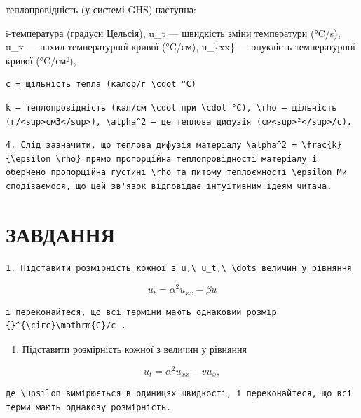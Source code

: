 \documentclass[
  ukrainian,
]{article}
\providecommand{\tightlist}{%
  \setlength{\itemsep}{0pt}\setlength{\parskip}{0pt}}
\begin{document}
теплопровідність (у системі GHS) наступна:

i-температура (градуси Цельсія), u\_t --- швидкість зміни температури
(°C/s), u\_x --- нахил температурної кривої (°C/см), u\_\{xx\} ---
опуклість температурної кривої (°C/см²),

\begin{verbatim}
c = щільність тепла (калор/г \cdot °C)
\end{verbatim}

\begin{verbatim}
k — теплопровідність (кал/см \cdot при \cdot °C), \rho — щільність (г/<sup>см3</sup>), \alpha^2 — це теплова дифузія (см<sup>²</sup>/с).
\end{verbatim}

\begin{verbatim}
4. Слід зазначити, що теплова дифузія матеріалу \alpha^2 = \frac{k}{\epsilon \rho} прямо пропорційна теплопровідності матеріалу і обернено пропорційна густині \rho та питому теплоємності \epsilon Ми сподіваємося, що цей зв'язок відповідає інтуїтивним ідеям читача.
\end{verbatim}

\section{ЗАВДАННЯ}\label{ux437ux430ux432ux434ux430ux43dux43dux44f-3}

\begin{verbatim}
1. Підставити розмірність кожної з u,\ u_t,\ \dots величин у рівняння
\end{verbatim}

\[
u_t = \alpha^2 u_{xx} - \beta u
\]

\begin{verbatim}
і переконайтеся, що всі терміни мають однаковий розмір {}^{\circ}\mathrm{C}/c .
\end{verbatim}

\begin{enumerate}
\def\labelenumi{\arabic{enumi}.}
\setcounter{enumi}{1}
\tightlist
\item
  Підставити розмірність кожної з величин у рівняння
\end{enumerate}

\[
u_t = \alpha^2 u_{xx} - v u_x,
\]

\begin{verbatim}
де \upsilon вимірюється в одиницях швидкості, і переконайтеся, що всі терми мають однакову розмірність.
\end{verbatim}
\end{document}
